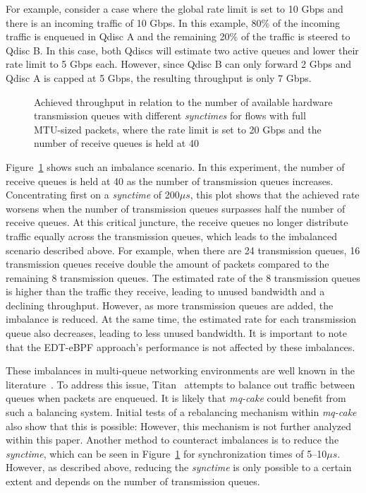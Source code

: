 For example, consider a case where the global rate limit is set to 10 Gbps and there is an incoming traffic of 10 Gbps.
%
In this example, 80\% of the incoming traffic is enqueued in Qdisc A and the remaining 20\% of the traffic is steered to Qdisc B. In this case, both Qdiscs will estimate two active queues and lower their rate limit to 5 Gbps each.
However, since Qdisc B can only forward 2 Gbps and Qdisc A is capped at 5 Gbps, the resulting throughput is only 7 Gbps.
%
\begin{figure}[H]
    \centering
    
    \caption{Achieved throughput in relation to the number of available hardware transmission queues with different \textit{synctimes} for flows with full MTU-sized packets, where the rate limit is set to 20 Gbps and the number of receive queues is held at 40}\label{fig:txq_imbalance_1514}
\end{figure}
Figure~\ref{fig:txq_imbalance_1514} shows such an imbalance scenario.
%
In this experiment, the number of receive queues is held at 40 as the number of transmission queues increases.
%
Concentrating first on a \textit{synctime} of 200$\mu s$, this plot shows that the achieved rate worsens when the number of transmission queues surpasses half the number of receive queues.
%
At this critical juncture, the receive queues no longer distribute traffic equally across the transmission queues, which leads to the imbalanced scenario described above.
%
For example, when there are 24 transmission queues, 16 transmission queues receive double the amount of packets compared to the remaining 8 transmission queues.
%
The estimated rate of the 8 transmission queues is higher than the traffic they receive, leading to unused bandwidth and a declining throughput.
%
However, as more transmission queues are added, the imbalance is reduced. At the same time, the estimated rate for each transmission queue also decreases, leading to less unused bandwidth. 
%
It is important to note that the EDT-eBPF approach's performance is not affected by these imbalances.

These imbalances in multi-queue networking environments are well known in the literature~\cite{titan, loom, silo}.
%
To address this issue, Titan~\cite{titan} attempts to balance out traffic between queues when packets are enqueued.
%
It is likely that \textit{mq-cake} could benefit from such a balancing system.
%
Initial tests of a rebalancing mechanism within \textit{mq-cake} also show that this is possible: However, this mechanism is not further analyzed within this paper.
%
Another method to counteract imbalances is to reduce the \textit{synctime}, which can be seen in Figure~\ref{fig:txq_imbalance_1514} for synchronization times of 5--10$\mu s$. However, as described above, reducing the \textit{synctime} is only possible to a certain extent and depends on the number of transmission queues.
%
